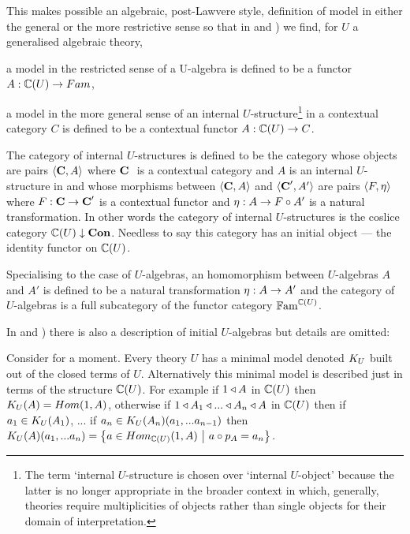 {This makes possible an  algebraic, post-Lawvere
style,  definition of model in either the general or the more restrictive sense so that in 
\cite{Cartmell78} and  \cite{Cartmell86}) we find,
for $U$ a generalised algebraic theory, 
\begin{point}
 a model in the restricted sense of a U-algebra is defined to be a functor $A: \ccat[C](U) \morph Fam$, 
\end{point}
\begin{point}
a model in the more general sense of an internal $U$-structure\footnote{The  term `internal $U$-structure is chosen over `internal $U$-object' because the latter
is no longer appropriate in the broader context in which, generally, theories require multiplicities of objects rather than single objects for their domain of interpretation.} in a contextual category
$C$ is defined to be a contextual functor $A: \ccat[C](U) \morph C$.
\end{point}
The category of internal $U$-structures is defined to be the category whose objects
are pairs $\tuple{\catc,A}$ 
where $\catcw$ is a contextual 
category and $A$ is an internal 
$U$-structure in
 \catcw and whose morphisms between $\tuple{\catc,A}$ and $\tuple{\catc',A'}$ are pairs $\tuple{F, \eta}$ where
$F: \catc \morph \catc'$ is a contextual functor and $\eta: A  \morph  F \circ A'$ is a natural transformation.
In other words the category of internal $U$-structures
is  the coslice category
$\CofU \downarrow \catCon$. Needless to say this category has an initial object
--- the identity functor on  $\CofU$.
 
Specialising to the case of $U$-algebras,  
an homomorphism between $U$-algebras $A$ and $A'$ is defined to be a 
natural transformation $\eta: A \morph A'$ and the category of $U$-algebras is a full subcategory of the 
functor category $\Fam^{\CofU}$. 

In \cite{Cartmell78} and  \cite{Cartmell86}) there is also a description of initial $U$-algebras but details are omitted:
\begin{tightquote}
Consider for a moment. Every theory $U$ has a minimal model denoted $\KU$ built out of the closed terms of $U$. Alternatively this minimal model is described just in terms of the structure $\CofU$. For example
if $1 \base A$ in $\CofU$ then 
$\KU(A)=Hom(1,A)$, otherwise if $1 \base A_1 \base ... \base A_n \base A$ in $\CofU$
then if $a_1 \in \KU(A_1)$, ... if $a_n \in \KU(A_n)(a_1,...a_{n-1})$ then 
$\KU(A)(a_1,...a_n)=\setsuchthat{a\in Hom_{\CofU}(1,A)}{a \circ p_A = a_n}$. \\
\end{tightquote} 

}
